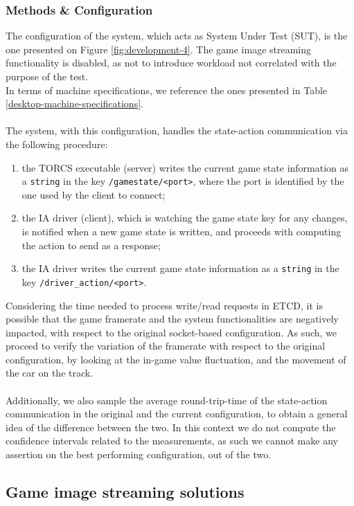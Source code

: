 \subsubsection{Methods \& Configuration}
The configuration of the system, which acts as System Under Test (SUT), is the one presented on Figure \ref{fig:development-4}. The game image streaming functionality is disabled, as not to introduce workload not correlated with the purpose of the test. \\
In terms of machine specifications, we reference the ones presented in Table \ref{desktop-machine-specifications}. \\ \\
The system, with this configuration, handles the state-action communication via the following procedure:
\begin{enumerate}
	\item the TORCS executable (server) writes the current game state information as a \texttt{string} in the key \texttt{/gamestate/<port>}, where the port is identified by the one used by the client to connect;
	\item the IA driver (client), which is watching the game state key for any changes, is notified when a new game state is written, and proceeds with computing the action to send as a response;
	\item the IA driver writes the current game state information as a \texttt{string} in the key \texttt{/driver\_action/<port>}.
\end{enumerate}
Considering the time needed to process write/read requests in ETCD, it is possible that the game framerate and the system functionalities are negatively impacted, with respect to the original socket-based configuration. As such, we proceed to verify the variation of the framerate with respect to the original configuration, by looking at the in-game value fluctuation, and the movement of the car on the track. \\ \\
Additionally, we also sample the average round-trip-time of the state-action communication in the original and the current configuration, to obtain a general idea of the difference between the two. In this context we do not compute the confidence intervals related to the measurements, as such we cannot make any assertion on the best performing configuration, out of the two.

\subsection{Game image streaming solutions}

